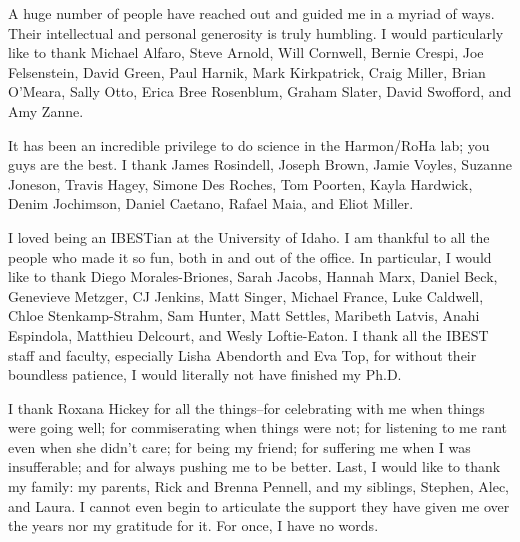 A huge number of people have reached out and guided me in a myriad of ways. Their intellectual and personal generosity is truly humbling. I would particularly like to thank Michael Alfaro, Steve Arnold, Will Cornwell, Bernie Crespi, Joe Felsenstein, David Green, Paul Harnik, Mark Kirkpatrick, Craig Miller, Brian O'Meara, Sally Otto, Erica Bree Rosenblum, Graham Slater, David Swofford, and Amy Zanne.

It has been an incredible privilege to do science in the Harmon/RoHa lab; you guys are the best. I thank James Rosindell, Joseph Brown, Jamie Voyles, Suzanne Joneson, Travis Hagey, Simone Des Roches, Tom Poorten, Kayla Hardwick, Denim Jochimson,  Daniel Caetano, Rafael Maia, and Eliot Miller.

I loved being an IBESTian at the University of Idaho. I am thankful to all the people who made it so fun, both in and out of the office. In particular, I would like to thank Diego Morales-Briones, Sarah Jacobs, Hannah Marx, Daniel Beck, Genevieve Metzger, CJ Jenkins, Matt Singer, Michael France, Luke Caldwell, Chloe Stenkamp-Strahm, Sam Hunter, Matt Settles, Maribeth Latvis, Anahi Espindola, Matthieu Delcourt, and Wesly Loftie-Eaton. I thank all the IBEST staff and faculty, especially Lisha Abendorth and Eva Top, for without their boundless patience, I would literally not have finished my Ph.D.

I thank Roxana Hickey for all the things--for celebrating with me when things were going well; for commiserating when things were not; for listening to me rant even when she didn't care; for being my friend; for suffering me when I was insufferable; and for always pushing me to be better. Last, I would like to thank my family: my parents, Rick and Brenna Pennell, and my siblings, Stephen, Alec, and Laura. I cannot even begin to articulate the support they have given me over the years nor my gratitude for it. For once, I have no words.



